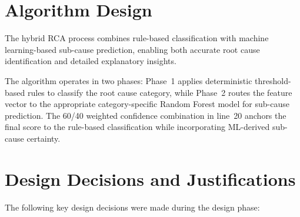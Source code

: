\section{Algorithm Design}
The hybrid RCA process combines rule-based classification with machine learning-based sub-cause prediction, enabling both accurate root cause identification and detailed explanatory insights.

The algorithm operates in two phases: Phase~1 applies deterministic threshold-based rules to classify the root cause category, while Phase~2 routes the feature vector to the appropriate category-specific Random Forest model for sub-cause prediction. The 60/40 weighted confidence combination in line~20 anchors the final score to the rule-based classification while incorporating ML-derived sub-cause certainty.

\section{Design Decisions and Justifications}
The following key design decisions were made during the design phase:

